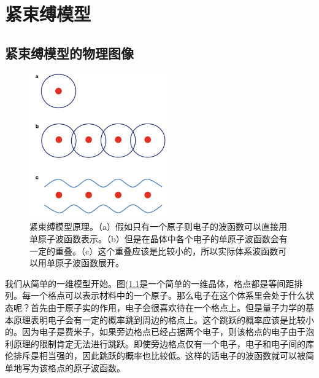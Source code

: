 \chapter{紧束缚模型}
\section{紧束缚模型的物理图像}
 \begin {figure}[tbp]
\centering 
\includegraphics[width=6cm]{./images/tightbindPic.png} 
\caption{紧束缚模型原理。（a）假如只有一个原子则电子的波函数可以直接用单原子波函数表示。（b）但是在晶体中各个电子的单原子波函数会有一定的重叠。（c）这个重叠应该是比较小的，所以实际体系波函数可以用单原子波函数展开。\cite{topoText}}
\label{tightbindPic}
\end {figure} 
我们从简单的一维模型开始。图(\ref{tightbindPic}是一个简单的一维晶体，格点都是等间距排列。每一个格点可以表示材料中的一个原子。那么电子在这个体系里会处于什么状态呢？首先由于原子实的作用，电子会很喜欢待在一个格点上。但是量子力学的基本原理表明电子会有一定的概率跳到周边的格点上。这个跳跃的概率应该是比较小的。因为电子是费米子，如果旁边格点已经占据两个电子，则该格点的电子由于泡利原理的限制肯定无法进行跳跃。即使旁边格点仅有一个电子，电子和电子间的库伦排斥是相当强的，因此跳跃的概率也比较低。这样的话电子的波函数就可以被简单地写为该格点的原子波函数。

